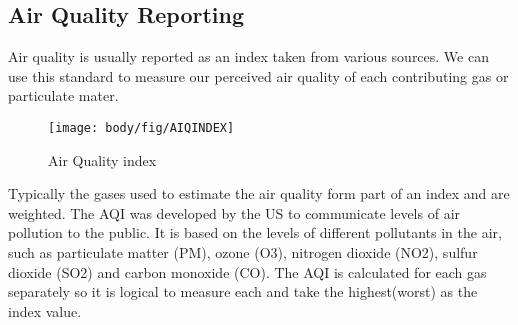 \subsection{Air Quality Reporting}
Air quality is usually reported as an index taken from various sources. We can use this standard to measure our perceived air quality of each contributing gas or particulate mater. \cite{airqualit:index} 

\begin{figure}[!htb]
	\centering
	\texttt{[image: body/fig/AIQINDEX]}
	\caption{Air Quality index \cite{GreenEcon2}}
	\label{fig:index}
\end{figure}

\noindent
Typically the gases used to estimate the air quality form part of an index and are weighted. The AQI was developed by the US to communicate levels of air pollution to the public\cite{Airly}.  It is based on the levels of different pollutants in the air, such as particulate matter (PM), ozone (O3), nitrogen dioxide (NO2), sulfur dioxide (SO2) and carbon monoxide (CO). The AQI is calculated for each gas separately so it is logical to measure each and take the highest(worst) as the index value.\cite{worldairqualityranking}








